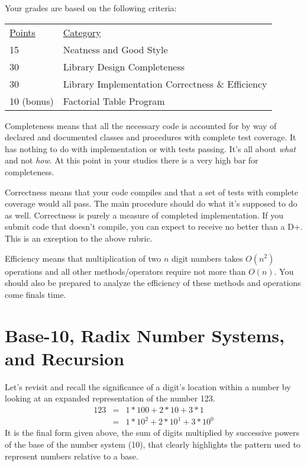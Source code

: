 \documentclass[10pt]{article}
\begin{document}
Your grades are based on the following criteria:
\begin{center}
\begin{tabular}{ll}
\underline{Points} & \underline{Category} \\
15  & Neatness and Good Style \\
30  & Library Design Completeness \\
30  & Library Implementation Correctness \& Efficiency \\
10 (bonus) & Factorial Table Program
\end{tabular}
\end{center}

Completeness means that all the necessary code is accounted for by way of declared and documented classes and procedures with complete test coverage. It has nothing to do with implementation or with tests passing. It's all about \textit{what} and not \textit{how}. At this point in your studies there is a very high bar for completeness.

Correctness means that your code compiles and that a set of tests with complete coverage would all pass. The main procedure should do what it's supposed to do as well.  Correctness is purely a measure of completed implementation.  If you submit code that doesn't compile, you can expect to receive no better than a D+.  This is an exception to the above rubric.

Efficiency means that multiplication of two $n$ digit numbers takes $O(n^2)$ operations and all other methods/operators require not more than $O(n)$. You should also be prepared to analyze the efficiency of these methods and operations come finals time.

\section{Base-10, Radix Number Systems, and Recursion}

Let's revisit and recall the significance of a digit's location within a number by looking at an expanded representation of the number 123.
\[
\begin{array}{rcl}
123 &=& 1*100 + 2*10 + 3*1 \\
    &=& 1*10^2 + 2*10^1 + 3*10^0
\end{array}
\]
It is the final form given above, the sum of digits multiplied by successive powers of the base of the number system (10), that clearly highlights the pattern used to represent numbers relative to a base.
\end{document}
